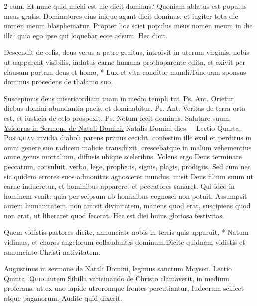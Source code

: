 \begin{multicols*}{2}
eum. Et nunc quid michi est hic dicit dominus? Quoniam ablatus est populus meus gratis. Dominatores eius inique agunt dicit dominus: et iugiter tota die nomen meum blasphematur. Propter hoc sciet populus meus nomen meum in die illa: quia ego ipse qui loquebar ecce adsum. Hec dicit.
\begin{responsory-doxology}
{Descendit de celis, deus verus a patre genitus, introivit in uterum virginis, nobis ut aapparent visibilis, indutus carne humana prothoparente edita, et exivit per clausam portam deus et homo, * Lux et vita conditor mundi.}{Tanquam sponsus dominus procedens de thalamo suo.}
\end{responsory-doxology}%
 Suscepimus deus misericordiam tuam in medio templi tui. {\color{Red} Ps.}  {\color{Red} Ant.} Orietur diebus domini abundantia pacis, et dominabitur. {\color{Red} Ps.}  {\color{Red} Ant.} Veritas de terra orta est, et iusticia de celo prospexit. {\color{Red} Ps.}  \V Notum fecit dominus. \R Salutare suum.
\newline \ul{Ysidorus in Sermone de Natali Domini.} Natalis Domini dies. \grecross \
{\color{Red} Lectio Quarta.}
\lettrine[lines=2]{\zallmancaps \color{Blue} P}{ostquam} invidia diaboli parens primus cecidit, confestim ille exul et perditus in omni genere suo radicem malicie transduxit, crescebatque in malum vehementius omne genus mortalium, diffusis ubique sceleribus. Volens ergo Deus terminare peccatum, consuluit, verbo, lege, prophetis, signis, plagis, prodigiis. Sed cum nec sic quidem errores suos admonitus agnosceret mundus, misit Deus filium suum ut carne indueretur, et hominibus appareret et peccatores sanaret. Qui ideo in hominem venit: quia per seipsum ab hominibus cognosci non potuit. Assumpsit autem humanitatem, non amisit divinitatem, manens quod erat, suscipiens quod non erat, ut liberaret quod fecerat. Hec est diei huius gloriosa festivitas.
\begin{responsory}
{Quem vidistis pastores dicite, annunciate nobis in terris quis apparuit, * Natum vidimus, et choros angelorum collaudantes dominum.}{Dicite quidnam vidistis et annunciate Christi nativitatem.}
\end{responsory}%
\newline \ul{Augustinus in sermone de Natali Domini,} legimus sanctum Moysen.
{\color{Red} Lectio Quinta.}
\lettrine[lines=2]{\zallmancaps \color{Red} Q}{uid} autem Sibilla vaticinando de Christo clamaverit, in medium proferans: ut ex uno lapide utroromque frontes percutiantur, Iudeorum scilicet atque paganorum. Audite quid dixerit.

\end{multicols*}
